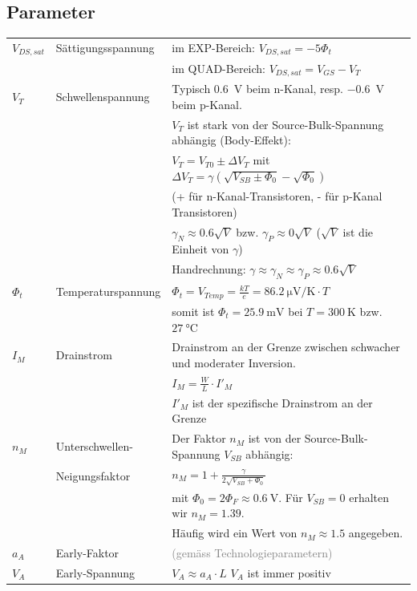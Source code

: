 \subsection{Parameter}
\begin{tabular}{|p{}|p{}|p{}|}
	\hline
	$V_{DS,sat}$&Sättigungsspannung&im EXP-Bereich:   $V_{DS,sat} = -5\Phi_t$ \\ 
	&&im QUAD-Bereich:	$V_{DS,sat} = V_{GS}-V_T$\\ \hline
	$V_T$&Schwellenspannung&Typisch \SI{0.6}{\volt} beim n-Kanal, resp. \SI{-0.6}{\volt} beim p-Kanal.\\
	&& $V_T$ ist stark von der Source-Bulk-Spannung abhängig (Body-Effekt):\\
	&&$V_T = V_{T0}\pm \Delta V_T$ mit $\Delta V_T = \gamma \left( \sqrt{V_{SB} \pm \Phi_0} - \sqrt{\Phi_0}\right)$\\
	&&(+ für n-Kanal-Transistoren, - für p-Kanal Transistoren)\\
	&& $\gamma_N \approx 0.6 \sqrt{V}$ bzw. $\gamma_P \approx 0 \sqrt{V}$ ($\sqrt{V}$ ist die Einheit von $\gamma$)\\
	&&Handrechnung: $\gamma \approx \gamma_N \approx \gamma_P \approx 0.6\sqrt{V}$\\ \hline
	$\Phi_t$&Temperaturspannung&$\Phi_t = V_{Temp} = \frac{kT}{e} = \SI{86.2}{\micro\volt / \kelvin} \cdot T$\\
	&&somit ist $\Phi_t = \SI{25.9}{\milli\volt}$ bei $T=\SI{300}{\kelvin}$ bzw. $\SI{27}{\degreeCelsius}$\\ \hline
	$I_M$&Drainstrom&Drainstrom an der Grenze zwischen schwacher und moderater Inversion.\\
	&&$I_M=\frac{W}{L}\cdot I'_M$\\
	&&$I'_M$ ist der spezifische Drainstrom an der Grenze\\ \hline
	$n_M$&Unterschwellen-&Der Faktor $n_M$ ist von der Source-Bulk-Spannung $V_{SB}$ abhängig:\\
	&Neigungsfaktor&$n_M=1+\frac{\gamma}{2\sqrt{V_{SB}+\Phi_0}}$\\
	&&mit $\Phi_0 = 2\Phi_F \approx \SI{0.6}{\volt}$. Für $V_{SB} = 0$ erhalten wir $n_M = 1.39$.\\
	&&Häufig wird ein Wert von $n_M \approx 1.5$ angegeben.\\ \hline
	$a_A$&Early-Faktor&\textcolor{gray}{(gemäss Technologieparametern)}\\ \hline
	$V_A$&Early-Spannung&$V_A \approx a_A \cdot L$ \hspace{0.5cm} $V_A$ ist immer positiv\\ \hline

\end{tabular}
